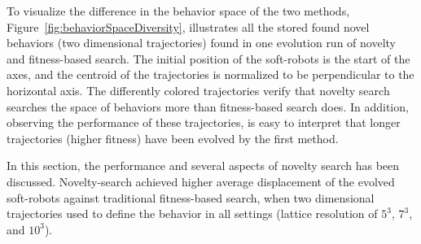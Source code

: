 To visualize the difference in the behavior space of the two methods, Figure~\ref{fig:behaviorSpaceDiversity}, illustrates all the stored found novel behaviors (two dimensional trajectories) found in one evolution run of novelty and fitness-based search. The initial position of the soft-robots is the start of the axes, and the centroid of the trajectories is normalized to be perpendicular to the horizontal axis. The differently colored trajectories verify that novelty search searches the space of behaviors more than fitness-based search does. In addition, observing the performance of these trajectories, is easy to interpret that longer trajectories (higher fitness) have been evolved by the first method. 

In this section, the performance and several aspects of novelty search has been discussed. Novelty-search achieved higher average displacement of the evolved soft-robots against traditional fitness-based search, when two dimensional trajectories used to define the behavior in all settings (lattice resolution of $5^3$, $7^3$, and $10^3$).


